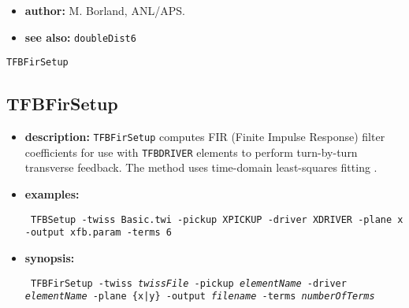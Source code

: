 \documentclass[11pt]{article}
\begin{document}
\begin{itemize}
\item {\bf author:} M. Borland, ANL/APS.

\item {\bf see also:} {\tt doubleDist6}
\end{itemize}

\newpage
\begin{center}{\Large\verb|TFBFirSetup|}\end{center}
\subsection{TFBFirSetup}

\begin{itemize}

\item {\bf description:} \verb|TFBFirSetup| computes FIR (Finite Impulse Response) filter
  coefficients for use with \verb|TFBDRIVER| elements to perform turn-by-turn transverse
  feedback. The method uses time-domain least-squares fitting \cite{Nakamura2004}.
  
\item {\bf examples:}
\begin{flushleft}{\tt
TFBSetup -twiss Basic.twi -pickup XPICKUP -driver XDRIVER -plane x -output xfb.param -terms 6
}\end{flushleft}

\item {\bf synopsis:}
\begin{flushleft}{\tt 
TFBFirSetup -twiss {\em twissFile} -pickup {\em elementName} -driver {\em elementName} -plane \{x|y\} 
-output {\em filename} -terms {\em numberOfTerms}
}\end{flushleft}


\end{itemize}
\end{document}
